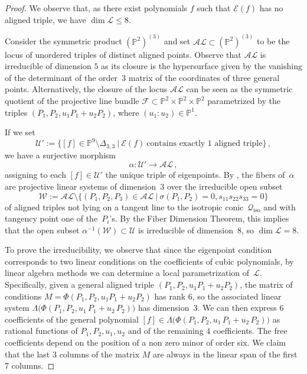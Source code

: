 \documentclass[a4paper, 11pt, reqno]{amsart}
\theoremstyle{plain}
\theoremstyle{definition}
\newcommand{\p}{\mathbb{P}}
\newcommand{\sL}{\mathcal{L}}
\newcommand{\sU}{\mathcal{U}}
\newcommand{\sF}{\mathcal{F}}
\newcommand{\iso}{\mathcal{Q}_{\mathrm{iso}}}
\newcommand{\Eig}[1]{\mathcal{E}\!\left( {#1} \right)}
\begin{document}
\begin{proof}
We observe that, as there exist
polynomials $f$ such that $\Eig{f}$ has no aligned triple, we have $\dim \sL \le 8$.

Consider the symmetric product $(\p^2)^{(3)}$ and set $\mathcal{AL} \subset (\p^2)^{(3)}$ to be the locus of unordered triples of distinct aligned points. Observe that $\mathcal{AL}$ is irreducible of dimension $5$ as its closure is the hypersurface given by the vanishing of the determinant of the order~$3$ matrix of the coordinates of three general points. Alternatively, the closure of the locus $\mathcal {AL}$ can be seen as the symmetric quotient of the projective line bundle $\sF \subset \p^2 \times \p^2 \times \p^2$ parametrized by the triples $(P_1, P_2, u_1 P_1 +u_2P_2)$, where $(u_1:u_2) \in \p^1$.

If we set
%
\[
  \sU':= \{[f]\in \p^9 \setminus \Delta_{3,3} \ | \ \Eig{f} \ \text{contains exactly $1$ aligned triple}\} \,,
\]
%
we have a surjective morphism
%
\[
  \alpha \colon \mathcal{U}' \to \mathcal{AL} \,,
\]
%
assigning to each $[f] \in \mathcal{U}'$ the unique triple of eigenpoints.
By , the fibers of~$\alpha$ are projective linear systems of dimension~$3$ over the irreducible open subset
%
\[
  \mathcal{W} := \mathcal{AL}
  \setminus \{(P_1,P_2,P_3) \in \mathcal{AL}
  \ | \ \sigma(P_1,P_2)=0, s_{11} s_{22} s_{33}=0\}
\]
%
of aligned triples not lying
on a tangent line to the isotropic conic~$\iso$ and with tangency point one of the~$P_i$'s. 
By the Fiber Dimension Theorem, this implies that the open subset $\alpha^{-1} (\mathcal{W}) \subset \sU$ is irreducible of dimension~$8$, so $\dim \sL =8$.

To prove the irreducibility, we observe that since the eigenpoint condition corresponds to two linear conditions on the coefficients of cubic polynomials, by linear algebra methods we can determine a local parametrization of~$\sL$.
Specifically, given a general aligned triple $(P_1, P_2, u_1 P_1 +u_2P_2)$, the matrix of conditions $M=\Phi(P_1, P_2, u_1 P_1 +u_2P_2)$ has rank $6$, so the associated linear system
$\Lambda \bigl( \Phi(P_1, P_2, u_1 \, P_1 + u_2 \, P_2) \bigr)$ has dimension~$3$. We can then express $6$ coefficients of the general polynomial
$[f]\in \Lambda \bigl( \Phi(P_1, P_2, u_1 \, P_1 + u_2 \, P_2) \bigr)$ as rational functions of $P_1,P_2,u_1,u_2$ and of the remaining $4$ coefficients. The free coefficients depend on the position of a non zero minor of order six.
We claim that the last $3$ columns of the matrix
$M$ are always in the linear span of the first $7$ columns.


\end{proof}
\end{document}
